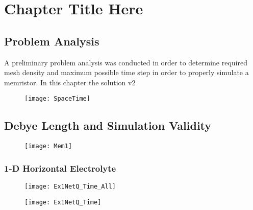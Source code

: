 
\chapter{Chapter Title Here} %

\label{Chapter5} %


\section{Problem Analysis}

A preliminary problem analysis was conducted in order to determine required mesh density and maximum possible time step in order to properly simulate a memristor. In this chapter the solution v2

\begin{figure}[htp]
\centering
\texttt{[image: SpaceTime]}
\caption{} 
\label{}
\end{figure}


\clearpage
\section{Debye Length and Simulation Validity}
\begin{figure}[!htp]
\centering
\texttt{[image: Mem1]}
\caption{} 
\label{}
\end{figure}


\subsection{1-D Horizontal Electrolyte}

\begin{figure}[!htp]
\centering
\texttt{[image: Ex1NetQ\_Time\_All]}
\caption{} 
\label{}
\end{figure}



\begin{landscape}
\begin{figure}[!htp]
\centering
\texttt{[image: Ex1NetQ\_Time]}
\caption{} 
\label{}
\end{figure}
\end{landscape}

